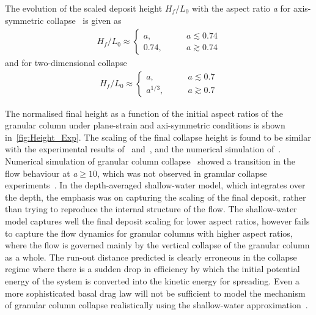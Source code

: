 The evolution of the scaled deposit height 
$\textit{H}_{\textit{f}}/\textit{L}_{\textit{0}}$ with the aspect ratio 
\textit{a} for axis-symmetric collapse~\citep{Lajeunesse2005} is given as 
\begin{align}
\textit{H}_{\textit{f}}/\textit{L}_{\textit{0}} \approx 
\begin{cases}
\textit{a}, \qquad &\textit{a}\lesssim 0.74 \\
0.74, \qquad &\textit{a}\gtrsim 0.74
\end{cases}
\end{align}
and for two-dimensional collapse
\begin{align}
\textit{H}_{\textit{f}}/\textit{L}_{\textit{0}} \approx 
\begin{cases}
\textit{a}, \qquad &\textit{a}\lesssim 0.7 \\
\textit{a}^{1/3}, \qquad &\textit{a}\gtrsim 0.7
\end{cases}
\end{align}

The normalised final height as a function of the initial aspect ratios of 
the granular column under plane-strain and axi-symmetric conditions is 
shown in~\cref{fig:Height_Exp}. The scaling of the final collapse height is 
found to be similar with the 
experimental results of~\citet{Lube2005} and~\citet{Balmforth2005}, and the 
numerical simulation of~\citet{Staron2005}. Numerical simulation of granular 
column collapse~\citep{Lacaze2008,Staron2005} showed a transition in the flow 
behaviour at \textit{a}$\ge 10$, which was not observed in granular collapse 
experiments~\citep{Balmforth2005,Lube2005,Lajeunesse2004}. In the 
depth-averaged shallow-water model, which integrates over the depth, the 
emphasis was on capturing the scaling of the final deposit, rather than trying 
to reproduce the internal structure of the flow. The shallow-water model 
captures well the final deposit scaling for lower aspect ratios, however fails 
to capture the flow dynamics for granular columns with higher aspect ratios, 
where the flow is governed mainly by the vertical collapse of the granular 
column as a whole. The run-out distance predicted is clearly erroneous in the 
collapse regime where there is a sudden drop in efficiency by which the initial 
potential energy of the system is converted into the kinetic energy for 
spreading. Even a more sophisticated basal drag law will not be sufficient to 
model the mechanism of granular column collapse realistically using the 
shallow-water approximation~\citep{Kerswell2005}.

